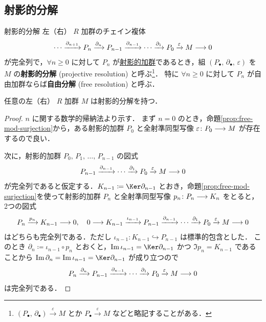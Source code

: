 \documentclass[algtopo_main]{subfiles}
\begin{document}

\subsection{射影的分解}

\begin{mydef}[label=def:projective-resolution]{射影的分解}
    左（右） $R$ 加群のチェイン複体
    \begin{align}
        \cdots \xrightarrow{\partial_{n+1}} P_n \xrightarrow{\partial_n} P_{n-1} \xrightarrow{\partial_{n-1}} \cdots \xrightarrow{\partial_1} P_0 \xrightarrow{\varepsilon} M \longrightarrow 0
    \end{align}
    が完全列で，$\forall n \ge 0$ に対して $P_n$ が\hyperref[def:proj-mod]{射影的加群}であるとき，組 $(P_\bullet,\, \partial_\bullet,\, \varepsilon)$ を $M$ の\textbf{射影的分解} (projective resolution) と呼ぶ\footnote{$(P_\bullet,\, \partial_\bullet) \xrightarrow{\varepsilon} M$ とか $P_\bullet \xrightarrow{\varepsilon} M$ などと略記することがある．}．
    特に $\forall n \ge 0$ に対して $P_n$ が自由加群ならば\textbf{自由分解} (free resolution) と呼ぶ．
\end{mydef}

\begin{myprop}[label=prop:proj-resol-basic]{}
    任意の左（右） $R$ 加群 $M$ は射影的分解を持つ．
\end{myprop}

\begin{proof}
    $n$ に関する数学的帰納法より示す．
    まず $n=0$ のとき，命題\ref{prop:free-mod-surjection}から，ある射影的加群 $P_0$ と全射準同型写像 $\varepsilon \colon P_0 \longrightarrow M$ が存在するので良い．

    次に，射影的加群 $P_0,\, P_1,\,\dots ,\, P_{n-1}$ の図式
    \begin{align}
        P_{n-1} \xrightarrow{\partial_{n-1}} \cdots \xrightarrow{\partial_{1}} P_0 \xrightarrow{\varepsilon} M \longrightarrow 0
    \end{align}
    が完全列であると仮定する．$K_{n-1} \coloneqq \Ker \partial_{n-1}$ とおき，命題\ref{prop:free-mod-surjection}を使って射影的加群 $P_n$ と全射準同型写像 $p_n \colon P_n \longrightarrow K_n$ をとると，2つの図式
    \begin{align}
        P_n \xrightarrow{p_n} K_{n-1} \longrightarrow 0,\quad 0 \longrightarrow K_{n-1} \xrightarrow{\iota_{n-1}} P_{n-1} \xrightarrow{\partial_{n-1}} \cdots \xrightarrow{\partial_1} P_0 \xrightarrow{\varepsilon} M \longrightarrow 0
    \end{align}
    はどちらも完全列である．ただし $\iota_{n-1} \colon K_{n-1} \hookrightarrow P_{n-1}$ は標準的包含とした．
    このとき $\partial_n \coloneqq \iota_{n-1} \circ p_{n}$ とおくと，$\Im \iota_{n-1} = \Ker \partial_{n-1}$ かつ $\Im p_n = K_{n-1}$ であることから $\Im \partial_n = \Im \iota_{n-1} = \Ker \partial_{n-1}$ が成り立つので
    \begin{align}
        P_{n} \xrightarrow{\partial_n} P_{n-1} \xrightarrow{\partial_{n-1}} \cdots \xrightarrow{\partial_{1}} P_0 \xrightarrow{\varepsilon} M \longrightarrow 0
    \end{align}
    は完全列である．
\end{proof}
\end{document}
